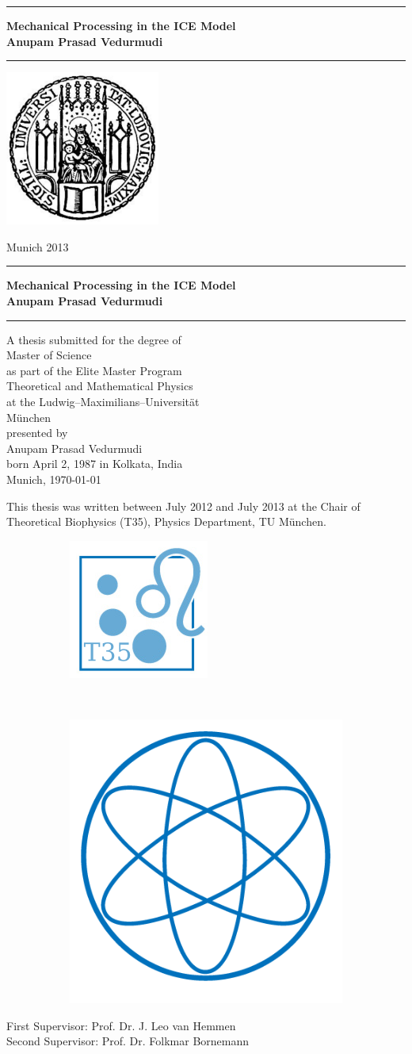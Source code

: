 \documentclass[12pt]{book}
\newcommand{\LMUTitle}[9]{
  \thispagestyle{empty}
  \vspace*{\stretch{1}}
  {\parindent0cm
   \rule{\linewidth}{.7ex}}
  \begin{flushright}

    \vspace*{\stretch{1}}
    \sffamily\bfseries\Huge
    #1\\
    \vspace*{\stretch{1}}
    \sffamily\bfseries\large
    #2
    \vspace*{\stretch{1}}
  \end{flushright}
  \rule{\linewidth}{.7ex}
  \vspace*{\stretch{5}}
  \begin{center}
    \includegraphics[width=2in]{siegel}
  \end{center}
  \vspace*{\stretch{1}}
  \begin{center}\sffamily\LARGE{#5}\end{center}
  \newpage
  \thispagestyle{empty}

  \cleardoublepage
  \thispagestyle{empty}

  \vspace*{\stretch{1}}
  {\parindent0cm
  \rule{\linewidth}{.7ex}}
  \begin{flushright}
    \vspace*{\stretch{1}}	
    \sffamily\bfseries\Huge
    #1\\
    \vspace*{\stretch{1}}
    \sffamily\bfseries\large
    #2
    \vspace*{\stretch{1}}
  \end{flushright}
  \rule{\linewidth}{.7ex}

  \vspace*{\stretch{3}}
  \begin{center}
      A thesis submitted for the degree of\\
      Master of Science\\
      as part of the Elite Master Program\\
      Theoretical and Mathematical Physics\\
      at the Ludwig--Maximilians--Universit\"{a}t\\
      M\"unchen\\
    \vspace*{\stretch{1}}
      presented by\\
      #2\\
      born April 2, 1987 in #3\\
    \vspace*{\stretch{2}}
      Munich, #6
  \end{center}

  \newpage
  \thispagestyle{empty}
  \noindent This thesis was written between July 2012 and July 2013 at the Chair of Theoretical Biophysics (T35), Physics Department, TU M\"{u}nchen.\\
  \vspace*{\stretch{1}}  
  \begin{figure}[htb!]
        \begin{subfigure}[b]{.5\textwidth}
         \flushleft
                \includegraphics[width=.3\textwidth]{Diagrams/T35logo2.png}
        \end{subfigure}%
        ~ %
        \begin{subfigure}[b]{0.5\textwidth}
        \flushright
                \includegraphics[width=.3\textwidth]{Diagrams/physik_logo2.png}
        \end{subfigure}
\end{figure}

  \begin{flushleft}
    \large First Supervisor:  #7 \\[1mm]
    \large Second Supervisor: #8 \\[1mm]
  \end{flushleft}

  \cleardoublepage
}
\begin{document}
  \frontmatter


  \LMUTitle
      {Mechanical Processing in the ICE Model
       }               %
      {Anupam Prasad Vedurmudi}                      %
      {Kolkata, India}                             %
      {Faculty of Physics}                         %
      {Munich 2013}                          %
      {\today}                            %
      {Prof. Dr. J. Leo van Hemmen}                          %
      {Prof. Dr. Folkmar Bornemann}                         %

 
 
 
 \cleardoublepage
 
 
 
  \tableofcontents


  \listoffigures


  \listoftables
  \cleardoublepage

  


  \mainmatter\setcounter{page}{1}
  
  
  
  
   

  
%  
 

  \backmatter
  
  \markboth{}{}

%  
%  
\end{document}
